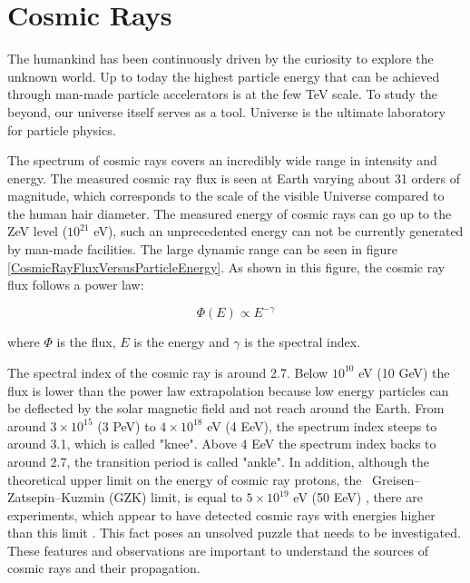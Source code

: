  
\section{Cosmic Rays}

The humankind has been continuously driven by the curiosity to explore the unknown world. Up to today the highest particle energy that can be achieved through man-made particle accelerators is at the few TeV scale. To study the beyond, our universe itself serves as a tool. Universe is the ultimate laboratory for particle physics.  \par 

The spectrum of cosmic rays covers an incredibly wide range in intensity and energy. The measured cosmic ray flux is seen at Earth varying about 31 orders of magnitude, which corresponds to the scale of the visible Universe compared to the human hair diameter. The measured energy of cosmic rays can go up to the ZeV level ($10^{21}$ eV), such an unprecedented energy can not be currently generated by man-made facilities. The large dynamic range can be seen in figure \ref{CosmicRayFluxVersusParticleEnergy}. As shown in this figure, the cosmic ray flux follows a power law: 

\begin{equation}
\Phi(E)\propto E^{-\gamma}
\end{equation}

where $\Phi$ is the flux, $E$ is the energy and $\gamma$ is the spectral index.

The spectral index of the cosmic ray is around 2.7. Below $10^{10}$ eV (10 GeV) the flux is lower than the power law extrapolation because low energy particles can be deflected by the solar magnetic field and not reach around the Earth. From around $3 \times 10^{15}$ (3 PeV) to $4 \times 10^{18}$ eV (4 EeV), the spectrum index steeps to around 3.1, which is called "knee". Above 4 EeV the spectrum index backs to around 2.7, the transition period is called "ankle". In addition, although the theoretical upper limit on the energy of cosmic ray protons, the  Greisen–Zatsepin–Kuzmin (GZK) limit, is equal to $5 \times 10^{19}$ eV (50 EeV) \cite{GZKPaper1, GZKPaper2}, there are experiments, which appear to have detected cosmic rays with energies higher than this limit \cite{OMGParticle1, OMGParticle2}. This fact poses an unsolved puzzle that needs to be investigated. These features and observations are important to understand the sources of cosmic rays and their propagation.  \par


